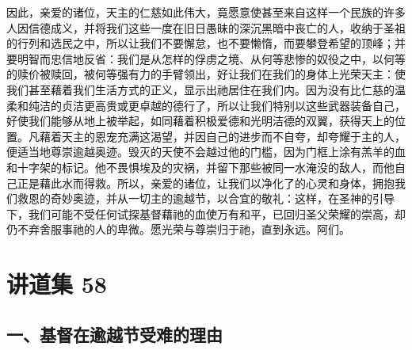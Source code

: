 因此，亲爱的诸位，天主的仁慈如此伟大，竟愿意使甚至来自这样一个民族的许多人因信德成义，并将我们这些一度在旧日愚昧的深沉黑暗中丧亡的人，收纳于圣祖的行列和选民之中，所以让我们不要懈怠，也不要懒惰，而要攀登希望的顶峰；并要明智而忠信地反省：我们是从怎样的俘虏之境、从何等悲惨的奴役之中，以何等的赎价被赎回，被何等强有力的手臂领出，好让我们在我们的身体上光荣天主：使我们甚至藉着我们生活方式的正义，显示出祂居住在我们内。因为没有比仁慈的温柔和纯洁的贞洁更高贵或更卓越的德行了，所以让我们特别以这些武器装备自己，好使我们能够从地上被举起，如同藉着积极爱德和光明洁德的双翼，获得天上的位置。凡藉着天主的恩宠充满这渴望，并因自己的进步而不自夸，却夸耀于主的人，便适当地尊崇逾越奥迹。毁灭的天使不会越过他的门槛，因为门框上涂有羔羊的血和十字架的标记。他不畏惧埃及的灾祸，并留下那些被同一水淹没的敌人，而他自己正是藉此水而得救。所以，亲爱的诸位，让我们以净化了的心灵和身体，拥抱我们救恩的奇妙奥迹，并从一切主的逾越节，以合宜的敬礼：这样，在圣神的引导下，我们可能不受任何试探基督藉祂的血使万有和平，已回归圣父荣耀的崇高，却仍不弃舍服事祂的人的卑微。愿光荣与尊崇归于祂，直到永远。阿们。\par



\section{讲道集 58}

\par


\subsection{一、基督在逾越节受难的理由}

